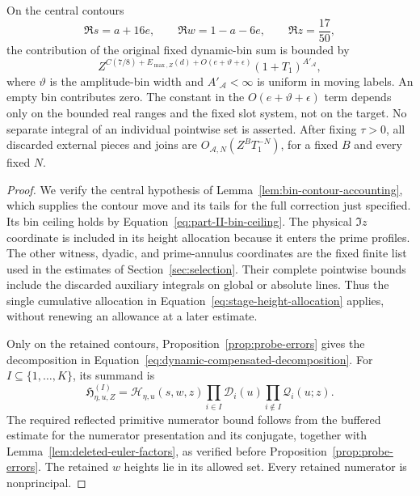 \begin{lemma}
On the central contours
\[
 \Re s=a+16e,\qquad \Re w=1-a-6e,\qquad \Re z=\frac{17}{50},
\]
the contribution of the original fixed dynamic-bin sum is bounded by
\[
 Z^{C(7/8)+E_{\max,Z}(d)+O(e+\vartheta+\epsilon)}
 (1+T_1)^{A'_{\mathcal A}},
\]
where \(\vartheta\) is the amplitude-bin width and
\(A'_{\mathcal A}<\infty\) is uniform in moving labels.  An empty bin
contributes zero.  The constant in the \(O(e+\vartheta+\epsilon)\) term
depends only on the bounded real ranges and the fixed slot system, not on
the target.  No separate integral of an individual pointwise set is
asserted.  After fixing \(\tau>0\), all discarded external pieces and joins
are \(O_{\mathcal A,N}(Z^B T_1^{-N})\), for a fixed \(B\) and every fixed
\(N\).
\end{lemma}

\begin{proof}
We verify the central hypothesis of
Lemma~\ref{lem:bin-contour-accounting}, which supplies the contour
move and its tails for the full correction just specified.  Its bin
ceiling holds by Equation~\eqref{eq:part-II-bin-ceiling}.  The physical
\(\Im z\) coordinate is included in its height allocation because it
enters the prime profiles.  The other witness, dyadic, and prime-annulus
coordinates are the fixed finite list used in the estimates of
Section~\ref{sec:selection}.  Their complete pointwise bounds include the
discarded auxiliary integrals on global or absolute lines.  Thus the
single cumulative allocation in Equation~\eqref{eq:stage-height-allocation}
applies, without renewing an allowance at a later estimate.

Only on the retained contours, Proposition~\ref{prop:probe-errors} gives
the decomposition in Equation~\eqref{eq:dynamic-compensated-decomposition}.
For \(I\subseteq\{1,\ldots,K\}\), its summand is
\[
 \mathfrak H_{\eta,u,Z}^{(I)}
 =\mathcal H_{\eta,u}(s,w,z)
       \prod_{i\in I}\mathcal D_i(u)
       \prod_{i\notin I}\mathcal Q_i(u;z).
\]
The required reflected primitive numerator bound follows from the
buffered estimate for the numerator presentation and its conjugate,
together with Lemma~\ref{lem:deleted-euler-factors}, as verified before
Proposition~\ref{prop:probe-errors}.  The retained \(w\) heights lie
in its allowed set.  Every retained numerator is nonprincipal.


\end{proof}
